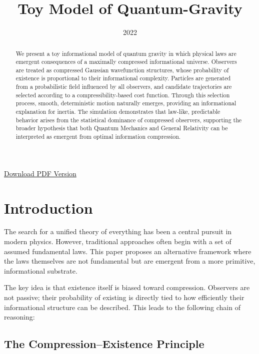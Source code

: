 \documentclass[11pt]{article}
\title{Toy Model of Quantum-Gravity}
\date{2022}
\begin{document}
\maketitle

\begin{abstract}
We present a toy informational model of quantum gravity in which physical laws are emergent consequences of a maximally compressed informational universe. Observers are treated as compressed Gaussian wavefunction structures, whose probability of existence is proportional to their informational complexity. Particles are generated from a probabilistic field influenced by all observers, and candidate trajectories are selected according to a compressibility-based cost function. Through this selection process, smooth, deterministic motion naturally emerges, providing an informational explanation for inertia. The simulation demonstrates that law-like, predictable behavior arises from the statistical dominance of compressed observers, supporting the broader hypothesis that both Quantum Mechanics and General Relativity can be interpreted as emergent from optimal information compression.
\end{abstract}


\ifdefined\ishtml
\begin{center}
\small \href{quantum-gravity-quantum-gravity.pdf}{Download PDF Version}
\end{center}
\fi

\section{Introduction}

The search for a unified theory of everything has been a central pursuit in modern physics. However, traditional approaches often begin with a set of assumed fundamental laws. This paper proposes an alternative framework where the laws themselves are not fundamental but are emergent from a more primitive, informational substrate.

The key idea is that existence itself is biased toward compression. Observers are not passive; their probability of existing is directly tied to how efficiently their informational structure can be described. This leads to the following chain of reasoning:

\subsection*{The Compression–Existence Principle}
\end{document}
